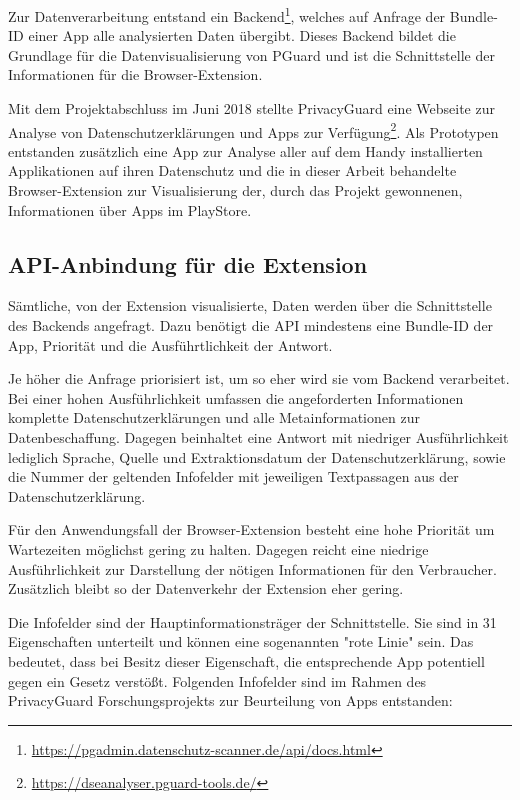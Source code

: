 Zur Datenverarbeitung entstand ein Backend\footnote{\url{https://pgadmin.datenschutz-scanner.de/api/docs.html}}, welches auf Anfrage der Bundle-ID einer App alle analysierten Daten übergibt. Dieses Backend bildet die Grundlage für die Datenvisualisierung von PGuard und ist die Schnittstelle der Informationen für die Browser-Extension.

Mit dem Projektabschluss im Juni 2018 stellte PrivacyGuard eine Webseite zur Analyse von Datenschutzerklärungen und Apps zur Verfügung\footnote{\url{https://dseanalyser.pguard-tools.de/}}. Als Prototypen entstanden zusätzlich eine App zur Analyse aller auf dem Handy installierten Applikationen auf ihren Datenschutz und die in dieser Arbeit behandelte Browser-Extension zur Visualisierung der, durch das Projekt gewonnenen, Informationen über Apps im PlayStore.

\subsection{API-Anbindung für die Extension}
\label{ss:apianbindung}

Sämtliche, von der Extension visualisierte, Daten werden über die Schnittstelle des Backends angefragt. Dazu benötigt die API mindestens eine Bundle-ID der App, Priorität und die Ausführtlichkeit der Antwort.

Je höher die Anfrage priorisiert ist, um so eher wird sie vom Backend verarbeitet. 
Bei einer hohen Ausführlichkeit umfassen die angeforderten Informationen komplette Datenschutzerklärungen und alle Metainformationen zur Datenbeschaffung. Dagegen beinhaltet eine Antwort mit niedriger Ausführlichkeit lediglich Sprache, Quelle und Extraktionsdatum der Datenschutzerklärung, sowie die Nummer der geltenden Infofelder mit jeweiligen Textpassagen aus der Datenschutzerklärung.

Für den Anwendungsfall der Browser-Extension besteht eine hohe Priorität um Wartezeiten möglichst gering zu halten. Dagegen reicht eine niedrige Ausführlichkeit zur Darstellung der nötigen Informationen für den Verbraucher. Zusätzlich bleibt so der Datenverkehr der Extension eher gering.

Die Infofelder sind der Hauptinformationsträger der Schnittstelle. Sie sind in 31 Eigenschaften unterteilt und können eine sogenannten "rote Linie" sein. Das bedeutet, dass bei Besitz dieser Eigenschaft, die entsprechende App potentiell gegen ein Gesetz verstößt. Folgenden Infofelder sind im Rahmen des PrivacyGuard Forschungsprojekts zur Beurteilung von Apps entstanden:

